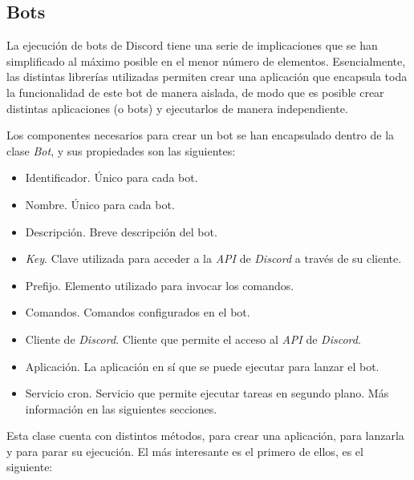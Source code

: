\subsection{Bots}

La ejecución de bots de Discord tiene una serie de implicaciones que se han simplificado al máximo posible en el menor número de elementos. Esencialmente, las distintas librerías utilizadas permiten crear una aplicación que encapsula toda la funcionalidad de este bot de manera aislada, de modo que es posible crear distintas aplicaciones (o bots) y ejecutarlos de manera independiente.

Los componentes necesarios para crear un bot se han encapsulado dentro de la clase \textit{Bot}, y sus propiedades son las siguientes:

\begin{itemize}
	\item Identificador. Único para cada bot.
	\item Nombre. Único para cada bot.
	\item Descripción. Breve descripción del bot.
	\item \textit{Key}. Clave utilizada para acceder a la \textit{API} de \textit{Discord} a través de su cliente.
	\item Prefijo. Elemento utilizado para invocar los comandos.
	\item Comandos. Comandos configurados en el bot.
	\item Cliente de \textit{Discord}. Cliente que permite el acceso al \textit{API} de \textit{Discord}.
	\item Aplicación. La aplicación en sí que se puede ejecutar para lanzar el bot.
	\item Servicio cron. Servicio que permite ejecutar tareas en segundo plano. Más información en las siguientes secciones.
\end{itemize}

Esta clase cuenta con distintos métodos, para crear una aplicación, para lanzarla y para parar su ejecución. El más interesante es el primero de ellos, es el siguiente:

